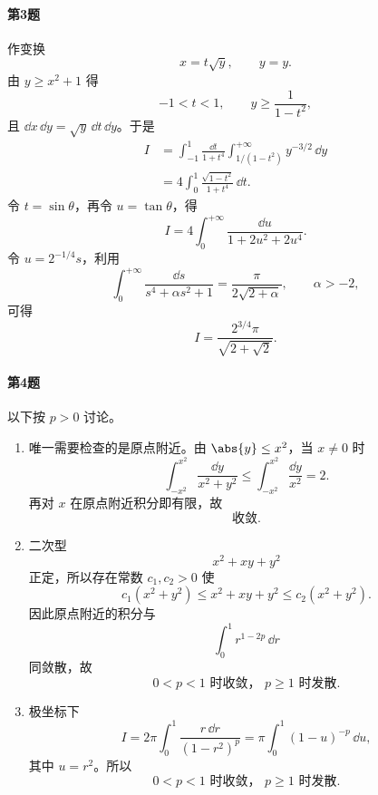 \paragraph{第3题}
\begin{xsolution}
作变换
\[
 x=t\sqrt y,
 \qquad y=y.
\]
由 $y\ge x^2+1$ 得
\[
 -1<t<1,
 \qquad y\ge\frac1{1-t^2},
\]
且 $\dd x\,\dd y=\sqrt y\,\dd t\,\dd y$。于是
\begin{align*}
 I&=\int_{-1}^1\frac{\dd t}{1+t^4}
 \int_{1/(1-t^2)}^{+\infty}y^{-3/2}\,\dd y\\
 &=4\int_0^1\frac{\sqrt{1-t^2}}{1+t^4}\,\dd t.
\end{align*}
令 $t=\sin\theta$，再令 $u=\tan\theta$，得
\[
 I=4\int_0^{+\infty}\frac{\dd u}{1+2u^2+2u^4}.
\]
令 $u=2^{-1/4}s$，利用
\[
 \int_0^{+\infty}\frac{\dd s}{s^4+\alpha s^2+1}
 =\frac\pi{2\sqrt{2+\alpha}},
 \qquad \alpha>-2,
\]
可得
\[
 \boxed{I=\frac{2^{3/4}\pi}{\sqrt{2+\sqrt2}}}.
\]
\end{xsolution}

\paragraph{第4题}
\begin{xsolution}
以下按 $p>0$ 讨论。
\begin{enumerate}[label=(\arabic*)]
  \item 唯一需要检查的是原点附近。由 $\abs{y}\le x^2$，当 $x\ne0$ 时
  \[
   \int_{-x^2}^{x^2}\frac{\dd y}{x^2+y^2}
   \le\int_{-x^2}^{x^2}\frac{\dd y}{x^2}=2.
  \]
  再对 $x$ 在原点附近积分即有限，故
  \[
    \boxed{\text{收敛}}.
  \]

  \item 二次型
  \[
    x^2+xy+y^2
  \]
  正定，所以存在常数 $c_1,c_2>0$ 使
  \[
    c_1(x^2+y^2)\le x^2+xy+y^2\le c_2(x^2+y^2).
  \]
  因此原点附近的积分与
  \[
    \int_0^1r^{1-2p}\,\dd r
  \]
  同敛散，故
  \[
    \boxed{0<p<1\text{ 时收敛， }p\ge1\text{ 时发散}}.
  \]

  \item 极坐标下
  \[
   I=2\pi\int_0^1\frac{r\,\dd r}{(1-r^2)^p}
   =\pi\int_0^1(1-u)^{-p}\,\dd u,
  \]
  其中 $u=r^2$。所以
  \[
    \boxed{0<p<1\text{ 时收敛， }p\ge1\text{ 时发散}}.
  \]
\end{enumerate}
\end{xsolution}


